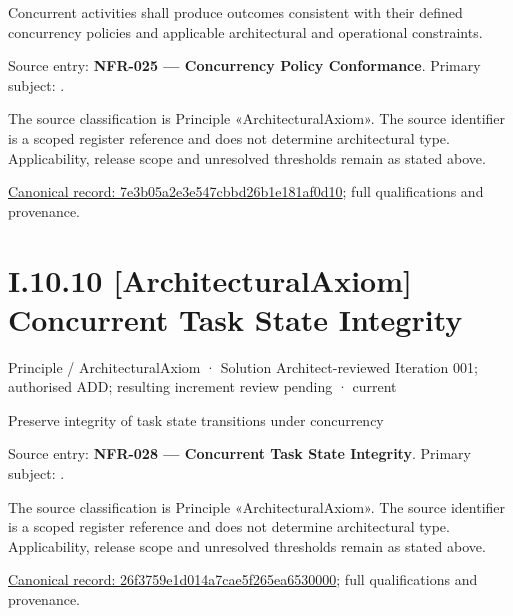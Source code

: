Concurrent activities shall produce outcomes consistent with their defined concurrency policies and applicable architectural and operational constraints.



Source entry: \textbf{NFR-025 — Concurrency Policy Conformance}. Primary subject: \texttt{}.



The source classification is Principle «ArchitecturalAxiom». The source identifier is a scoped register reference and does not determine architectural type. Applicability, release scope and unresolved thresholds remain as stated above.


{\footnotesize \href{../../../../../../../../continuum/motivation/principle/architectural-axiom/7e3b05a2e3e547cbbd26b1e181af0d10.md}{Canonical record: 7e3b05a2e3e547cbbd26b1e181af0d10}; full qualifications and provenance.}\par
\section*{I.10.10 [ArchitecturalAxiom] Concurrent Task State Integrity}
\label{navigation:I.10.10}

\label{element:26f3759e1d014a7cae5f265ea6530000}
{\small Principle / ArchitecturalAxiom · Solution Architect-reviewed Iteration 001; authorised ADD; resulting increment review pending · current}\par

Preserve integrity of task state transitions under concurrency



Source entry: \textbf{NFR-028 — Concurrent Task State Integrity}. Primary subject: \texttt{}.



The source classification is Principle «ArchitecturalAxiom». The source identifier is a scoped register reference and does not determine architectural type. Applicability, release scope and unresolved thresholds remain as stated above.


{\footnotesize \href{../../../../../../../../continuum/motivation/principle/architectural-axiom/26f3759e1d014a7cae5f265ea6530000.md}{Canonical record: 26f3759e1d014a7cae5f265ea6530000}; full qualifications and provenance.}\par
